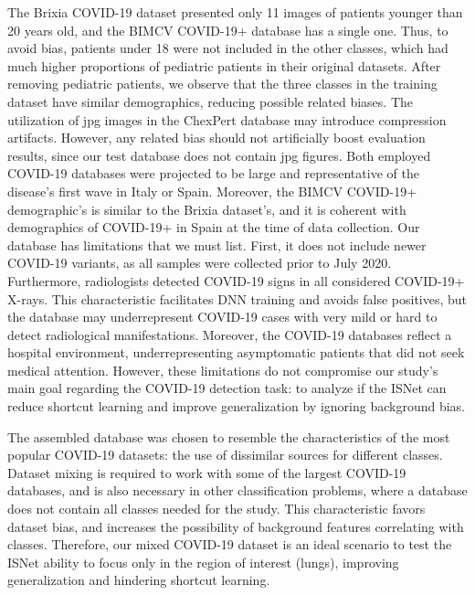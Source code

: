 \documentclass[fleqn,10pt]{wlscirep}
\begin{document}
{The Brixia COVID-19 dataset presented only 11 images of patients younger than 20 years old, and the BIMCV COVID-19+ database has a single one. Thus, to avoid bias, patients under 18 were not included in the other classes, which had much higher proportions of pediatric patients in their original datasets. After removing pediatric patients, we observe that the three classes in the training dataset have similar demographics, reducing possible related biases. The utilization of jpg images in the ChexPert database may introduce compression artifacts. However, any related bias should not artificially boost evaluation results, since our test database does not contain jpg figures. Both employed COVID-19 databases were projected to be large and representative of the disease's first wave in Italy or Spain. Moreover, the BIMCV COVID-19+ demographic's is similar to the Brixia dataset's, and it is coherent with demographics of COVID-19+ in Spain at the time of data collection\cite{BimcvSet}. Our database has limitations that we must list. First, it does not include newer COVID-19 variants, as all samples were collected prior to July 2020. Furthermore, radiologists detected COVID-19 signs in all considered COVID-19+ X-rays. This characteristic facilitates DNN training and avoids false positives, but the database may underrepresent COVID-19 cases with very mild or hard to detect radiological manifestations. Moreover, the COVID-19 databases reflect a hospital environment, underrepresenting asymptomatic patients that did not seek medical attention. However, these limitations do not compromise our study's main goal regarding the COVID-19 detection task: to analyze if the ISNet can reduce shortcut learning and improve generalization by ignoring background bias.

The assembled database was chosen to resemble the characteristics of the most popular COVID-19 datasets: the use of dissimilar sources for different classes. Dataset mixing is required to work with some of the largest COVID-19 databases, and is also necessary in other classification problems, where a database does not contain all classes needed for the study. This characteristic favors dataset bias, and increases the possibility of background features correlating with classes. Therefore, our mixed COVID-19 dataset is an ideal scenario to test the ISNet ability to focus only in the region of interest (lungs), improving generalization and hindering shortcut learning.

}
\end{document}
